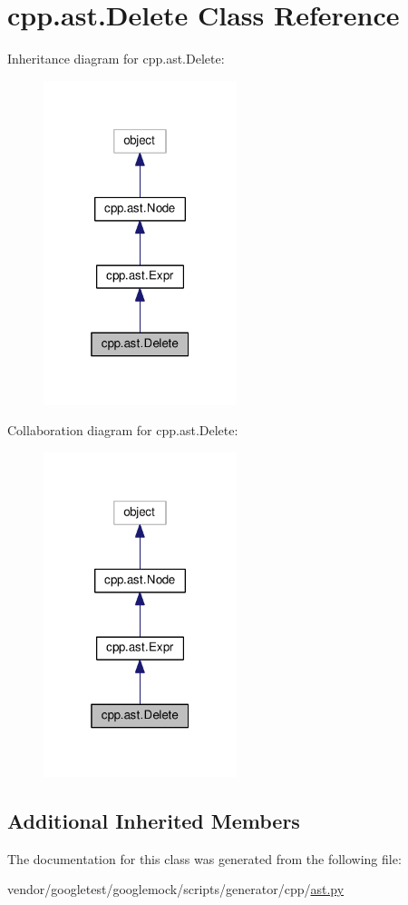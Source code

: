 \hypertarget{classcpp_1_1ast_1_1Delete}{}\section{cpp.\+ast.\+Delete Class Reference}
\label{classcpp_1_1ast_1_1Delete}


Inheritance diagram for cpp.\+ast.\+Delete\+:
\nopagebreak
\begin{figure}[H]
\begin{center}
\leavevmode
\includegraphics[width=160pt]{classcpp_1_1ast_1_1Delete__inherit__graph}
\end{center}
\end{figure}


Collaboration diagram for cpp.\+ast.\+Delete\+:
\nopagebreak
\begin{figure}[H]
\begin{center}
\leavevmode
\includegraphics[width=160pt]{classcpp_1_1ast_1_1Delete__coll__graph}
\end{center}
\end{figure}
\subsection*{Additional Inherited Members}


The documentation for this class was generated from the following file\+:\begin{DoxyCompactItemize}
\item 
vendor/googletest/googlemock/scripts/generator/cpp/\hyperlink{ast_8py}{ast.\+py}\end{DoxyCompactItemize}
